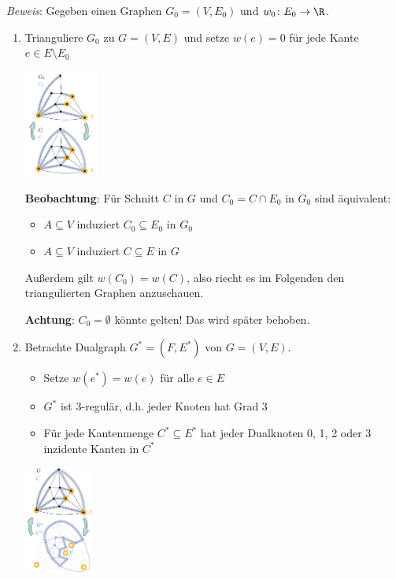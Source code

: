 \textit{Beweis}: Gegeben einen Graphen $G_0=(V, E_0)$ und $w_0\colon E_0\rightarrow\R$.
\begin{enumerate}
	\item Trianguliere $G_0$ zu $G=(V,E)$ und setze $w(e)=0$ für jede Kante $e\in E\setminus E_0$
	\begin{center}
		\includegraphics[width=0.19\textwidth]{images/mmc-1.png}
	\end{center}
	\textbf{Beobachtung}: Für Schnitt $C$ in $G$ und $C_0=C\cap E_0$ in $G_0$ sind äquivalent:
	\begin{itemize}
		\item $A\subseteq V$ induziert $C_0\subseteq E_0$ in $G_0$
		\item $A\subseteq V$ induziert $C\subseteq E$ in $G$
	\end{itemize}
	Außerdem gilt $w(C_0)=w(C)$, also riecht es im Folgenden den triangulierten Graphen anzuschauen. 
	
	\textbf{Achtung}: $C_0=\emptyset$ könnte gelten! Das wird später behoben.
	
	\item Betrachte Dualgraph $G^*=(F,E^*)$ von $G=(V,E)$.
	\begin{itemize}
		\item Setze $w(e^*)=w(e)$ für alle $e\in E$
		\item $G^*$ ist 3-regulär, d.h. jeder Knoten hat Grad 3
		\item Für jede Kantenmenge $C^*\subseteq E^*$ hat jeder Dualknoten 0, 1, 2 oder 3 inzidente Kanten in $C^*$
	\end{itemize}
	\begin{center}
		\includegraphics[width=0.18\textwidth]{images/mmc-2.png}
	\end{center}
	

\end{enumerate}

